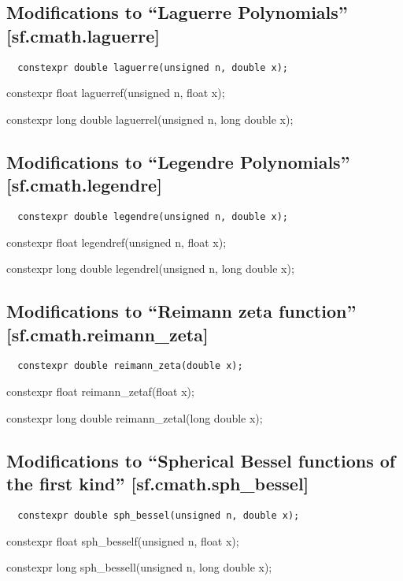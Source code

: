 \documentclass[prd,twocolumn,amsmath,amssymb,nofootinbib,eqsecnum]{revtex4-1}
\newcommand{\code}[1]{{\tt #1}}
\newcommand{\highlight}[1]{{\color{red} #1}}
\newcommand{\bigund}{{\Huge{\_}}}
\begin{document}
\subsection{Modifications to  ``Laguerre Polynomials''  [sf.cmath.laguerre]}

\code{
	\highlight{constexpr} double laguerre(unsigned n, double x);
	
	\highlight{constexpr} float laguerref(unsigned n, float x);
	
	\highlight{constexpr} long double laguerrel(unsigned n, long double x);

}

\subsection{Modifications to  ``Legendre Polynomials''  [sf.cmath.legendre]}

\code{
	\highlight{constexpr} double legendre(unsigned n, double x);
	
	\highlight{constexpr} float legendref(unsigned n, float x);
	
	\highlight{constexpr} long double legendrel(unsigned n, long double x);

}


\subsection{Modifications to  ``Reimann zeta function''  [sf.cmath.reimann{\bigund}zeta]}

\code{
	\highlight{constexpr} double reimann\_zeta(double x);
	
	\highlight{constexpr} float reimann\_zetaf(float x);
	
	\highlight{constexpr} long double reimann\_zetal(long double x);

}

\subsection{Modifications to  ``Spherical Bessel functions of the first kind''  [sf.cmath.sph{\bigund}bessel]}

\code{
	\highlight{constexpr} double sph\_bessel(unsigned n, double x);
	
	\highlight{constexpr} float sph\_besself(unsigned n, float x);
	
	\highlight{constexpr} long sph\_bessell(unsigned n, long double x);

}
\end{document}
